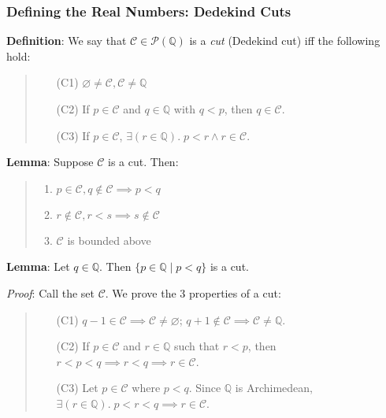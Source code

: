 \documentclass[11pt]{article}
\begin{document}
\subsubsection{Defining the Real Numbers: Dedekind Cuts}

\textbf{Definition}: We say that $\mathcal{C} \in \mathcal{P}(\mathbb{Q})$ is a \emph{cut} (Dedekind cut) iff the following hold:
\begin{quote}\vspace{-0.3cm}
	\begin{enumerate}
	\item[(C1)] $\varnothing \neq \mathcal{C}, \mathcal{C} \neq \mathbb{Q}$
	\item[(C2)] If $p \in \mathcal{C}$ and $q \in \mathbb{Q}$ with $q < p$, then $q \in \mathcal{C}$.
	\item[(C3)] If $p \in \mathcal{C}$, $\exists (r \in \mathbb{Q}).\; p < r \land r \in \mathcal{C}$.
	\end{enumerate}
\end{quote}

\textbf{Lemma}: Suppose $\mathcal{C}$ is a cut. Then:
\begin{quote}\vspace{-0.3cm}
	\begin{enumerate}
	\item $p \in \mathcal{C}, q \notin \mathcal{C} \implies p < q$
	\item$r \notin \mathcal{C}, r < s \implies s \notin \mathcal{C}$
	\item $\mathcal{C}$ is bounded above
	\end{enumerate}
\end{quote}

\textbf{Lemma}: Let $q \in \mathbb{Q}$. Then $\{p \in \mathbb{Q} \mid p < q\}$ is a cut.

\emph{Proof}: Call the set $\mathcal{C}$. We prove the 3 properties of a cut:
\begin{quote}\vspace{-0.3cm}
	\begin{enumerate}
	\item[(C1)] $q - 1 \in \mathcal{C} \implies \mathcal{C} \neq \varnothing$; $q + 1 \notin \mathcal{C} \implies \mathcal{C} \neq \mathbb{Q}$.
	\item[(C2)] If $p \in \mathcal{C}$ and $r \in \mathbb{Q}$ such that $r < p$, then $r < p < q \implies r < q \implies r \in \mathcal{C}$.
	\item[(C3)] Let $p \in \mathcal{C}$ where $p < q$. Since $\mathbb{Q}$ is Archimedean, $\exists (r \in \mathbb{Q}).\; p < r < q \implies r \in \mathcal{C}$.
	\end{enumerate}
\end{quote}
\end{document}
